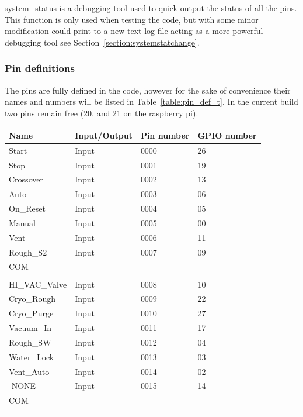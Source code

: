 \documentclass{article}
\begin{document}
system\_status is a debugging tool used to quick output the status of all the pins. This function is only used when testing the code, but with some minor modification could print to a new text log file acting as a more powerful debugging tool see Section~\ref{section:systemstatchange}.

\subsubsection{Pin definitions}
\label{section:pin_def}
The pins are fully defined in the code, however for the sake of convenience their names and numbers will be listed in Table~\ref{table:pin_def_t}. In the current build two pins remain free (20, and 21 on the raspberry pi).
\begin{table}[h!]
\centering
    \begin{tabular}{|l|l|l|l|}
    \hline
    Name  & Input/Output& Pin number & GPIO number    \\ \hline
    Start & Input & 0000 & 26   \\ \hline
    Stop & Input & 0001 & 19 \\ \hline
    Crossover & Input & 0002 & 13 \\ \hline
    Auto & Input & 0003 & 06 \\ \hline
    On\_Reset & Input & 0004 & 05 \\ \hline
    Manual & Input & 0005 & 00 \\ \hline
    Vent & Input & 0006 & 11 \\ \hline
    Rough\_S2 & Input & 0007 & 09 \\ \hline
    COM & & & \\ \hline
    & & & \\ \hline
    HI\_VAC\_Valve & Input & 0008 & 10 \\ \hline
    Cryo\_Rough & Input & 0009 & 22 \\ \hline
    Cryo\_Purge & Input & 0010 & 27 \\ \hline
    Vacuum\_In & Input & 0011 & 17 \\ \hline
    Rough\_SW & Input & 0012 & 04 \\ \hline
    Water\_Lock & Input & 0013 & 03 \\ \hline
    Vent\_Auto & Input & 0014 & 02 \\ \hline
    -NONE- & Input & 0015 & 14 \\ \hline
    COM &  &  &  \\ \hline
     &  &  &  \\ \hline

\end{tabular}
\end{table}
\end{document}
